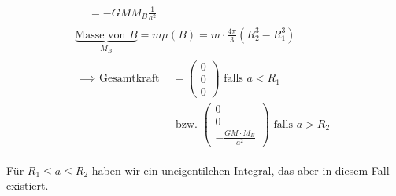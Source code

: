 \begin{bsp*}[note = Gravitation einer Kugelschale]
\begin{gather*}
\begin{split}
				&= -GM M_B \frac{1}{a^2}
		\end{split} \\
		\underbrace{\text{Masse von $B$}}_{M_B} = m \mu(B) = m \cdot \frac{4\pi}{3} (R_2^3 - R_1^3) \\
		\begin{split}
			\implies \text{ Gesamtkraft }
				&= \begin{pmatrix} 0 \\ 0 \\ 0 \end{pmatrix} \text{ falls } a < R_1 \\
				&\text{ bzw. } \begin{pmatrix} 0 \\ 0 \\ -\frac{GM \cdot M_B}{a^2} \end{pmatrix} \text{ falls } a > R_2
		\end{split}
	\end{gather*}
	\begin{bem}
		Für $R_1 \leq a \leq R_2$ haben wir ein uneigentilchen Integral, das aber in diesem Fall existiert.
	\end{bem}
\end{bsp*}

